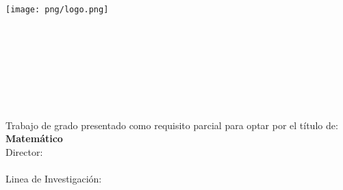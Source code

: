\begin{center}
    \texttt{[image: png/logo.png]}\\%
	\vspace{1.5cm} %
	\textbf{\Huge{\printtitle}} \\ 
    \vspace{5cm}  %
 	\textbf{\LARGE{\printauthor}} \\
    \vspace{5cm}%
 	\printuniversity \\
 	\printfaculty \\
 	\printplace \\
 	\printyear
    \thispagestyle{empty}
\end{center}
\newpage
\begin{center}
	\textbf{\Huge{\printtitle}} \\ 
	\vspace{3.5cm} 
	\textbf{\LARGE{\printauthor}} \\
	\vspace{2cm}
	Trabajo de grado presentado como requisito parcial para optar por el título de: \\
	\textbf{Matemático}\\
	\vspace{2cm}
	Director:\\
	\printdirector\\
	\vspace{2cm}
	Linea de Investigación:\\
	\printline\\
	\vspace{2cm}
	\printuniversity \\
	\printfaculty \\
	\printplace \\
	\printyear
	\thispagestyle{empty}
	\newpage
\end{center}
